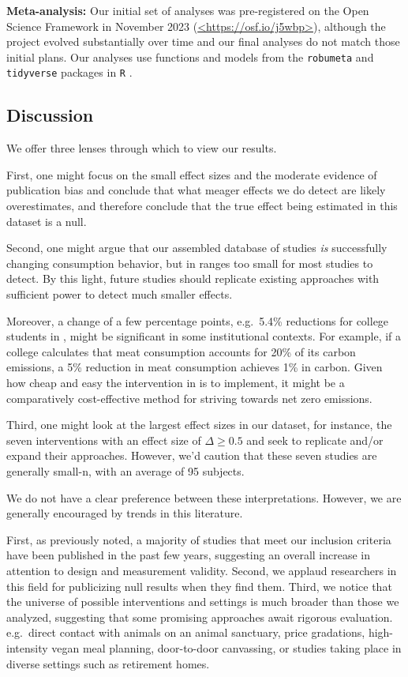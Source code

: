 \documentclass[sn-nature,pdflatex]{sn-jnl}
\begin{document}
\textbf{Meta-analysis:} Our initial set of analyses was pre-registered
on the Open Science Framework in November 2023
(\url{<https://osf.io/j5wbp>}), although the project evolved
substantially over time and our final analyses do not match those
initial plans. Our analyses use functions and models from the
\texttt{robumeta} \citep{fisher2015} and \texttt{tidyverse}
\citep{wickham2019} packages in \texttt{R} \citep{Rlang}.

\subsection{Discussion}\label{discussion}

We offer three lenses through which to view our results.

First, one might focus on the small effect sizes and the moderate
evidence of publication bias and conclude that what meager effects we do
detect are likely overestimates, and therefore conclude that the true
effect being estimated in this dataset is a null.

Second, one might argue that our assembled database of studies \emph{is}
successfully changing consumption behavior, but in ranges too small for
most studies to detect. By this light, future studies should replicate
existing approaches with sufficient power to detect much smaller
effects.

Moreover, a change of a few percentage points, e.g.~5.4\% reductions for
college students in \citep{jalil2023}, might be significant in some
institutional contexts. For example, if a college calculates that meat
consumption accounts for 20\% of its carbon emissions, a 5\% reduction
in meat consumption achieves 1\% in carbon. Given how cheap and easy the
intervention in \citep{jalil2023} is to implement, it might be a
comparatively cost-effective method for striving towards net zero
emissions.

Third, one might look at the largest effect sizes in our dataset, for
instance, the seven interventions with an effect size of
\(\Delta \geq 0.5\)
\citep{bianchi2022, carfora2023, merrill2009, piester2020} and seek to
replicate and/or expand their approaches. However, we'd caution that
these seven studies are generally small-n, with an average of 95
subjects.

We do not have a clear preference between these interpretations.
However, we are generally encouraged by trends in this literature.

First, as previously noted, a majority of studies that meet our
inclusion criteria have been published in the past few years, suggesting
an overall increase in attention to design and measurement validity.
Second, we applaud researchers in this field for publicizing null
results when they find them. Third, we notice that the universe of
possible interventions and settings is much broader than those we
analyzed, suggesting that some promising approaches await rigorous
evaluation. e.g.~direct contact with animals on an animal sanctuary,
price gradations, high-intensity vegan meal planning, door-to-door
canvassing, or studies taking place in diverse settings such as
retirement homes.
\end{document}
